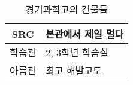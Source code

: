 \documentclass{article}
\begin{document}
\begin{table}[h]
	\centering
	\caption{경기과학고의 건물들}
	\label{tab:gshs_bldgs}
	\begin{tabular}{|c|l|}
		\hline
		SRC & 본관에서 제일 멀다 \\ \hline
		학습관 & 2, 3학년 학습실 \\ \hline
		아름관 & 최고 해발고도    \\ \hline
	\end{tabular}
\end{table}
\end{document}

